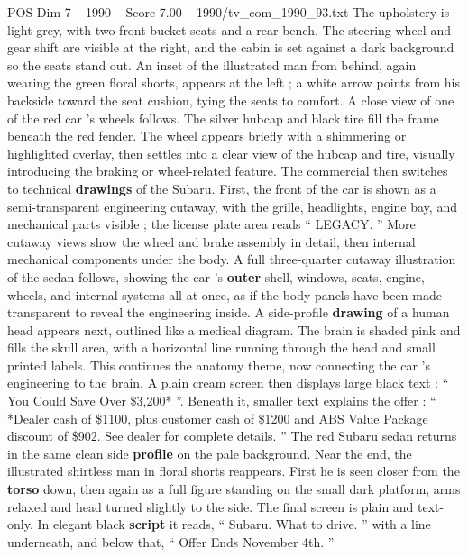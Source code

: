 \begin{textsample}{POS Dim 7 – 1990 – Score 7.00 – 1990/tv\_com\_1990\_93.txt}
The upholstery is light grey, with two front bucket seats and a rear bench.
The steering wheel and gear shift are visible at the right, and the cabin is set against a dark background so the seats stand out.
An inset of the illustrated man from behind, again wearing the green floral shorts, appears at the left ; a white arrow points from his backside toward the seat cushion, tying the seats to comfort.
A close view of one of the red car ’s wheels follows.
The silver hubcap and black tire fill the frame beneath the red fender.
The wheel appears briefly with a shimmering or highlighted overlay, then settles into a clear view of the hubcap and tire, visually introducing the braking or wheel-related feature.
The commercial then switches to technical \textbf{drawings} of the Subaru.
First, the front of the car is shown as a semi-transparent engineering cutaway, with the grille, headlights, engine bay, and mechanical parts visible ; the license plate area reads “ LEGACY. ” More cutaway views show the wheel and brake assembly in detail, then internal mechanical components under the body.
A full three-quarter cutaway illustration of the sedan follows, showing the car ’s \textbf{outer} shell, windows, seats, engine, wheels, and internal systems all at once, as if the body panels have been made transparent to reveal the engineering inside.
A side-profile \textbf{drawing} of a human head appears next, outlined like a medical diagram.
The brain is shaded pink and fills the skull area, with a horizontal line running through the head and small printed labels.
This continues the anatomy theme, now connecting the car ’s engineering to the brain.
A plain cream screen then displays large black text : “ You Could Save Over \$3,200* ”.
Beneath it, smaller text explains the offer : “ *Dealer cash of \$1100, plus customer cash of \$1200 and ABS Value Package discount of \$902.
See dealer for complete details. ” The red Subaru sedan returns in the same clean side \textbf{profile} on the pale background.
Near the end, the illustrated shirtless man in floral shorts reappears.
First he is seen closer from the \textbf{torso} down, then again as a full figure standing on the small dark platform, arms relaxed and head turned slightly to the side.
The final screen is plain and text-only.
In elegant black \textbf{script} it reads, “ Subaru.
What to drive. ” with a line underneath, and below that, “ Offer Ends November 4th. ”

\end{textsample}
